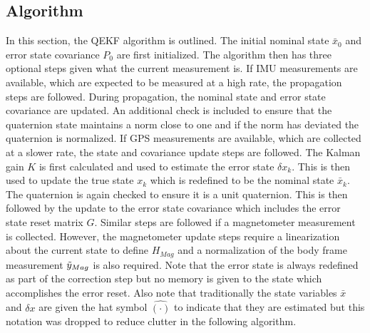 \subsection{Algorithm}
In this section, the QEKF algorithm is outlined. The initial nominal state $\bar{x}_0$ and error state covariance $P_0$ are first initialized. The algorithm then has three optional steps given what the current measurement is. If IMU measurements are available, which are expected to be measured at a high rate, the propagation steps are followed. During propagation, the nominal state and error state covariance are updated. An additional check is included to ensure that the quaternion state maintains a norm close to one and if the norm has deviated the quaternion is normalized. If GPS measurements are available, which are collected at a slower rate, the state and covariance update steps are followed. The Kalman gain $K$ is first calculated and used to estimate the error state $\delta x_k$. This is then used to update the true state $x_k$ which is redefined to be the nominal state $\bar{x}_k$. The quaternion is again checked to ensure it is a unit quaternion. This is then followed by the update to the error state covariance which includes the error state reset matrix $G$. Similar steps are followed if a magnetometer measurement is collected. However, the magnetometer update steps require a linearization about the current state to define $H_{Mag}$ and a normalization of the body frame measurement $\Tilde{y}_{Mag}$ is also required. Note that the error state is always redefined as part of the correction step but no memory is given to the state which accomplishes the error reset. Also note that traditionally the state variables $\bar{x}$ and $\delta x$ are given the hat symbol $\hat{(\cdot)}$ to indicate that they are estimated but this notation was dropped to reduce clutter in the following algorithm.

